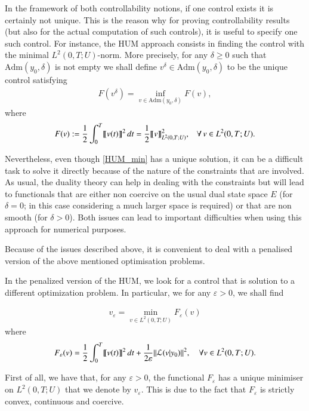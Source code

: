 In the framework of both controllability notions, if one control exists it is certainly not unique. This is the reason why for proving controllability results (but also for the actual computation of such controls), it is useful to specify one such control. For instance, the HUM approach consists in finding the control with the minimal $L^2(0,T;U)$-norm. More precisely, for any $\delta\geq 0$ such that $\textrm{Adm}(y_0,\delta)$ is not empty we shall define
$v^{\delta}\in \textrm{Adm}(y_0,\delta)$ to be the unique control satisfying
\begin{align}\label{HUM_min}
	F(v^{\delta}) = \inf_{v\in\textrm{Adm}(y_0,\delta)} F(v),
\end{align}
where 
\begin{align*}
	F(v):= \frac{1}{2}\int_0^T \llbracket v(t)\rrbracket^2\,dt = \frac{1}{2}\llbracket v\rrbracket^2_{L^2(0,T;U)}, \;\;\;\forall\, v\in L^2(0,T;U). 
\end{align*}

Nevertheless, even though \eqref{HUM_min} has a unique solution, it can be a difficult task to solve it directly because of the nature of the constraints that are involved. As usual, the duality theory can help in dealing with the constraints but will lead to functionals that are either non coercive on the usual dual state space $E$ (for $\delta = 0$; in this
case considering a much larger space is required) or that are non smooth (for $\delta > 0$). Both issues can lead to important difficulties when using this approach for numerical purposes.

Because of the issues described above, it is convenient to deal with a penalised version of the above mentioned optimisation problems.

In the penalized version of the HUM, we look for a control that is solution to a different optimization problem. In particular, we for any $\varepsilon>0$, we shall find

\begin{align}\label{min_ve}
	v_\varepsilon=\min_{v\in L^2(0,T;U)} F_\varepsilon (v)
\end{align}
where
\begin{align*}
	F_\varepsilon(v)=\frac{1}{2}\int_0^T\llbracket v(t)\rrbracket^2\,dt+\frac{1}{2\varepsilon}{\left\|\mathcal L(v|y_0)\right\|}_{}^2, \quad \forall v\in L^2(0,T;U).
\end{align*}

First of all, we have that, for any $\varepsilon > 0$, the functional $F_\varepsilon$ has a unique minimiser on $L^2(0,T;U)$  that we denote by $v_\varepsilon$. This is
due to the fact that $F_\varepsilon$ is strictly convex, continuous and coercive.

